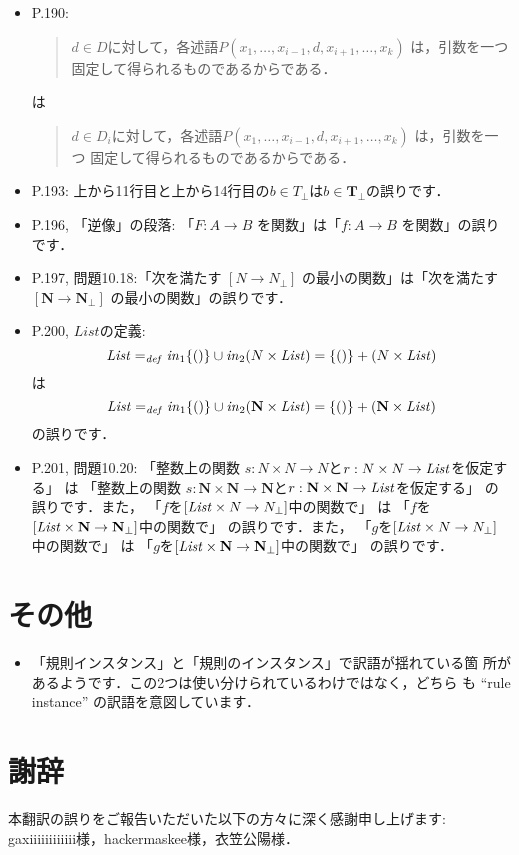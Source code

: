 \documentclass[12pt,titlepage,twoside,openright,dvipdfmx]{jsbook}
\theoremstyle{definition}
\begin{document}
\begin{itemize}
\item P.190:
  \begin{quote}
    $d\in D$に対して，各述語$P(x_1,\ldots,x_{i-1},d,x_{i+1},\ldots,x_k)$ は，引数を一つ
    固定して得られるものであるから\inclusive{}である．
  \end{quote}
  は
  \begin{quote}
    $d\in D_i$に対して，各述語$P(x_1,\ldots,x_{i-1},d,x_{i+1},\ldots,x_k)$ は，引数を一つ
    固定して得られるものであるから\inclusive{}である．
  \end{quote}
\item P.193: 上から11行目と上から14行目の$b\in T_\bot$は$b\in \mathbf{T}_\bot$の誤りです．
\item P.196, 「逆像」の段落: 「$F:A\to B$ を関数」は「$f:A\to B$ を関数」の誤りです．
\item P.197, 問題10.18:「次を満たす $[N\to N_\bot]$ の最小の関数」は「次を満たす $[\mathbf{N}\to \mathbf{N}_\bot]$ の最小の関数」の誤りです．
\item P.200, $\mathit{List}$の定義:
  \[
    {\it List} =_{\mathit{def}} {\it in}_1\{()\} \cup {\it in}_2(N\times{\it List}) =
    \{()\} + (N\times{\it List})
  \]
  は
  \[
    {\it List} =_{\mathit{def}} {\it in}_1\{()\} \cup {\it in}_2(\mathbf{N}\times{\it List}) =
    \{()\} + (\mathbf{N}\times{\it List})
  \]
  の誤りです．
\item P.201, 問題10.20:
  「整数上の関数 $s:N\times N\to N$と$r:N\times N\to{\it List}$を仮定する」
  は
  「整数上の関数 $s:\mathbf{N}\times \mathbf{N}\to \mathbf{N}$と$r:\mathbf{N}\times \mathbf{N}\to{\it List}$を仮定する」
  の誤りです．また，
  「$f$を$[{\it List}\times N\to N_\bot]$中の関数で」
  は
  「$f$を$[{\it List}\times \mathbf{N}\to \mathbf{N}_\bot]$中の関数で」
  の誤りです．また，
  「$g$を$[{\it List}\times N\to N_\bot]$中の関数で」
  は
  「$g$を$[{\it List}\times \mathbf{N}\to \mathbf{N}_\bot]$中の関数で」
  の誤りです．
\end{itemize}

\section*{その他}

\begin{itemize}
\item 「規則インスタンス」と「規則のインスタンス」で訳語が揺れている箇
  所があるようです．この2つは使い分けられているわけではなく，どちら
  も ``rule instance'' の訳語を意図しています．
\end{itemize}

\section*{謝辞}

本翻訳の誤りをご報告いただいた以下の方々に深く感謝申し上げます: gaxiiiiiiiiiiii様，hackermaskee様，衣笠公陽様．
\end{document}
